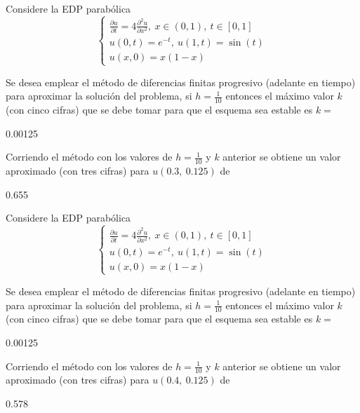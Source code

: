 \documentclass{article}
\begin{document}
\begin{quiz}{}
\begin{cloze}{}
\begin{numerical}[points=18]{}
	\end{numerical}
\end{cloze}
    \begin{cloze}{}
	Considere la EDP parab\'olica
	\[\begin{cases}
		\displaystyle\frac{\partial u}{\partial t} = 4\frac{\partial^2 u}{\partial x^2}, \ x\in(0,1), \ t\in[0,1] \\
		u(0,t) = e^{-t}, \ u(1,t)=\sin(t) \\
		u(x,0) = x(1-x)
	\end{cases}\]
	\begin{numerical}[points=15]{}
		Se desea emplear el m\'etodo de diferencias finitas progresivo  (adelante en tiempo) para aproximar la soluci\'on del problema, si $h=\frac{1}{10}$ entonces el m\'aximo valor $k$ (con cinco cifras) que se debe tomar para que el esquema sea estable es $k=$\item 0.00125
	\end{numerical}
	\begin{numerical}[points=18]{}
		Corriendo el m\'etodo con los valores de $h=\frac{1}{10}$ y $k$ anterior se obtiene un valor aproximado (con tres cifras) para $u(0.3,\ 0.125)$ de \item[tolerance=0.003] 0.655
	\end{numerical}
\end{cloze}
    \begin{cloze}{}
	Considere la EDP parab\'olica
	\[\begin{cases}
		\displaystyle\frac{\partial u}{\partial t} = 4\frac{\partial^2 u}{\partial x^2}, \ x\in(0,1), \ t\in[0,1] \\
		u(0,t) = e^{-t}, \ u(1,t)=\sin(t) \\
		u(x,0) = x(1-x)
	\end{cases}\]
	\begin{numerical}[points=15]{}
		Se desea emplear el m\'etodo de diferencias finitas progresivo  (adelante en tiempo) para aproximar la soluci\'on del problema, si $h=\frac{1}{10}$ entonces el m\'aximo valor $k$ (con cinco cifras) que se debe tomar para que el esquema sea estable es $k=$\item 0.00125
	\end{numerical}
	\begin{numerical}[points=18]{}
		Corriendo el m\'etodo con los valores de $h=\frac{1}{10}$ y $k$ anterior se obtiene un valor aproximado (con tres cifras) para $u(0.4,\ 0.125)$ de \item[tolerance=0.003] 0.578
	\end{numerical}

\end{cloze}
\end{quiz}
\end{document}
